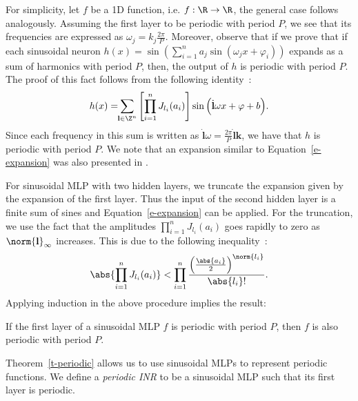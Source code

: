 For simplicity, let $f$ be a 1D function, i.e. $f:\R\to\R$, the general case follows analogously. 
Assuming the first layer to be periodic with period $P$, we see that its frequencies are expressed as $\omega_j=k_{j}\frac{2\pi}{P}$. 
Moreover, observe that if we prove that if each sinusoidal neuron $h(x)=\sin\left(\sum_{i=1}^n a_j\sin(\omega_j x + \varphi_i)\right)$ expands as a sum of harmonics with period $P$, then, the output of $h$ is periodic with period $P$. The proof of this fact follows from the following identity~\cite{novello2022understanding}:
\begin{align}\label{e-expansion}
    h(x)= \!\!\sum_{\textbf{l}\in\Z^n}\left[\prod_{i=1}^n J_{l_i}(a_i)\right]\sin\Big(\dot{\textbf{l}}{\omega x +\varphi}+ b\Big).
\end{align}
Since each frequency in this sum is written as $\dot{\textbf{l}}{\omega}=\frac{2\pi}{P}\dot{\textbf{l}}{\textbf{k}}$, we have that $h$ is periodic with period $P$.
We note that an expansion similar to Equation~\ref{e-expansion} was also presented in \cite{yuce2022structured}.


For sinusoidal MLP with two hidden layers, we truncate the expansion given by the expansion of the first layer. Thus the input of the second hidden layer is a finite sum of sines and Equation~\ref{e-expansion} can be applied.
For the truncation, we use the fact that the amplitudes
$\prod_{i=1}^n J_{l_i}(a_i)$ goes rapidly to zero as $\norm{\textbf{l}}_{\infty}$ increases. This is due to the following inequality~\cite{novello2022understanding}:
\begin{align}\label{e-upper-bound-freq}
    \abs{\prod_{i=1}^n J_{l_i}(a_i)}<
    \prod_{i=1}^n\frac{\left(\frac{\abs{a_i}}{2}\right)^{\norm{l_i}}}{\abs{l_i}!}.
\end{align}
Applying induction in the above procedure implies the result:
\begin{theorem}
\label{t-periodic}
    If the first layer of a sinusoidal MLP $f$ is periodic with period $P$, then $f$ is also periodic with period $P$.
\end{theorem}

Theorem~\ref{t-periodic} allows us to use sinusoidal MLPs to represent periodic functions. 
We define a \textit{periodic INR} to be a sinusoidal MLP such that its first layer is periodic. 


